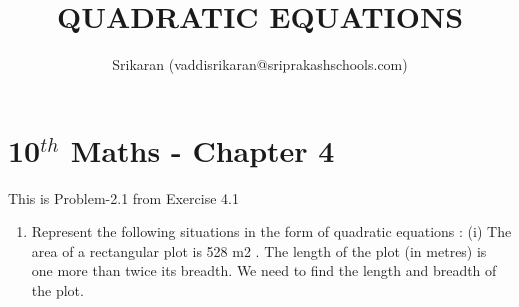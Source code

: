 \documentclass[12pt]{article}
\title{QUADRATIC EQUATIONS}
\author{Srikaran (vaddisrikaran@sriprakashschools.com)}
\begin{document}
\maketitle
\section*{10$^{th}$ Maths - Chapter 4}
This is Problem-2.1 from Exercise 4.1
\begin{enumerate}
\item  Represent the following situations in the form of quadratic equations :
(i) The area of a rectangular plot is 528 m2
. The length of the plot (in metres) is one
more than twice its breadth. We need to find the length and breadth of the plot.

\end{enumerate}
\end{document}
